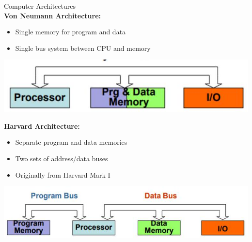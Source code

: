 \begin{definition}{Computer Architectures}\\
\textbf{Von Neumann Architecture:}
\begin{itemize}
  \item Single memory for program and data
  \item Single bus system between CPU and memory
\end{itemize}

\includegraphics[width=\linewidth]{images/2024_12_29_79e6b22f503fb7b4f718g-13}

\textbf{Harvard Architecture:}
\begin{itemize}
  \item Separate program and data memories
  \item Two sets of address/data buses
  \item Originally from Harvard Mark I
\end{itemize}

\includegraphics[width=\linewidth]{images/2024_12_29_79e6b22f503fb7b4f718g-13(2)}
\end{definition}

